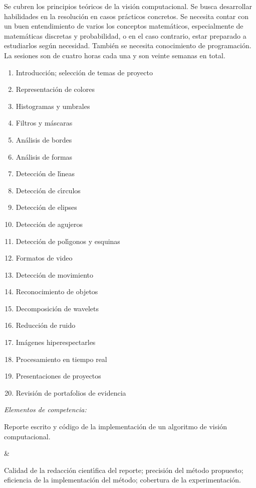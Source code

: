 \documentclass[10 pt]{article}
\begin{document}
Se cubren los principios te\'{o}ricos de la visi\'{o}n computacional.  Se
busca desarrollar habilidades en la resoluci\'{o}n en casos
pr\'{a}cticos concretos. Se necesita contar con un buen entendimiento
de varios los conceptos matem\'{a}ticos, especialmente de
matem\'{a}ticas discretas y probabilidad, o en el caso contrario,
estar preparado a estudiarlos seg\'{u}n necesidad. Tambi\'{e}n se
necesita conocimiento de programaci\'{o}n.  La sesiones son de cuatro
horas cada una y son veinte semanas en total.
\begin{enumerate}[itemsep=-3pt]
\item{Introducci\'{o}n; selecci\'{o}n de temas de proyecto}
\item{Representaci\'{o}n de colores}
\item{Histogramas y umbrales}
\item{Filtros y m\'{a}scaras}
\item{An\'{a}lisis de bordes}
\item{An\'{a}lisis de formas}
\item{Detecci\'{o}n de l\'{\i}neas}
\item{Detecci\'{o}n de c\'{\i}rculos}
\item{Detecci\'{o}n de elipses}
\item{Detecci\'{o}n de agujeros}
\item{Detecci\'{o}n de pol\'{\i}gonos y esquinas}
\item{Formatos de video}
\item{Detecci\'{o}n de movimiento}
\item{Reconocimiento de objetos}
\item{Decomposici\'{o}n de wavelets}
\item{Reducci\'{o}n de ruido}
\item{Im\'{a}genes hiperespectarles}
\item{Procesamiento en tiempo real}
\item{Presentaciones de proyectos}
\item{Revisi\'{o}n de portafolios de evidencia}
\end{enumerate}

{\em Elementos de competencia:}



Reporte escrito y c\'{o}digo de la implementaci\'{o}n de un algoritmo de
visi\'{o}n computacional.

&

Calidad de la redacci\'{o}n cient\'{\i}fica del reporte; precisi\'{o}n
del m\'{e}todo propuesto; eficiencia de la implementaci\'{o}n del
m\'{e}todo; cobertura de la experimentaci\'{o}n.
\end{document}
